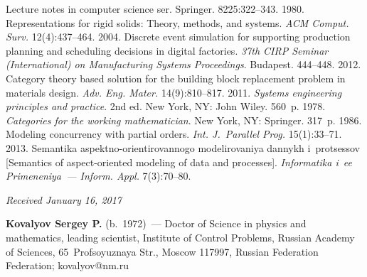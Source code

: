 \begin{multicols}{2}
{{\begin{thebibliography}{99}
Lecture notes in computer science ser. Springer. 
8225:322--343.
 1980. Representations for rigid solids: 
Theory, methods, and systems. \textit{ACM 
Comput. Surv.} 12(4):437--464.
2004. Discrete 
event simulation for supporting production planning and scheduling decisions in 
digital factories. \textit{37th CIRP Seminar (International) on Manufacturing 
Systems Proceedings}. Budapest.  444--448.
 2012. 
Category theory based solution for the building 
block replacement problem in materials design. 
\textit{Adv. Eng. Mater.} 14(9):810--817.
2011. \textit{Systems engineering 
principles and practice}. 2nd ed. New York, NY: John Wiley. 560~p.
 1978. \textit{Categories for the working mathematician}. 
New York, NY: Springer. 317~p.
 1986. Modeling concurrency with partial orders. 
\textit{Int. J.~Parallel Prog.} 15(1):33--71.
 2013. 
Semantika aspektno-ori\-en\-ti\-ro\-van\-no\-go modelirovaniya dannykh 
i~protsessov [Semantics of aspect-oriented modeling of data and processes]. 
\textit{Informatika i~ee  Primeneniya~--- Inform. Appl.} 7(3):70--80.
\end{thebibliography}

 }
 }

\end{multicols}

\vspace*{-9pt}

\hfill{\small\textit{Received January 16, 2017}}

\vspace*{-18pt}

\Contrl

\noindent
\textbf{Kovalyov Sergey P.} (b.\ 1972)~--- Doctor of Science in physics and 
mathematics, leading scientist, Institute of Control Problems, Russian 
Academy of Sciences, 65~Profsoyuznaya Str., Moscow 117997, Russian 
Federation Federation; \mbox{kovalyov@nm.ru} 

\label{end\stat}


\renewcommand{\bibname}{\protect\rm Литература} 